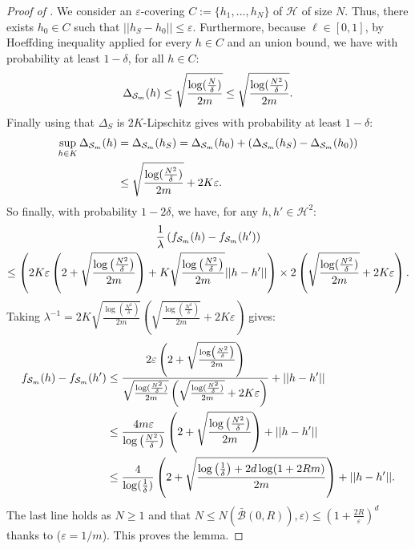\begin{noaddcontents}
\begin{proof}[Proof of ]
We consider an $\varepsilon$-covering $C:=\{h_1,...,h_N\}$ of $\mathcal{H}$ of size $N$.
Thus, there exists $h_0\in C$ such that $||h_S- h_0||\leq \varepsilon$.
Furthermore, because $\ell \in [0,1]$, by Hoeffding inequality applied for every $h\in C$ and an union bound, we have with probability at least $1-\delta$, for all $h\in C$:
\[ \Delta_{\mathcal{S}_m}(h) \leq  \sqrt{\frac{\log(\frac{N}{\delta})}{2m}} \leq   \sqrt{\frac{\log(\frac{N^2}{\delta})}{2m}}. \]
Finally using that $\Delta_S$ is $2K$-Lipschitz gives with probability at least $1-\delta$:
\begin{align*}
\sup_{h\in K} \Delta_{\mathcal{S}_m}(h) &= \Delta_{\mathcal{S}_m}(h_S) = \Delta_{\mathcal{S}_m}(h_0) + \left(\Delta_{\mathcal{S}_m}(h_S)- \Delta_{\mathcal{S}_m}(h_0)  \right) \\
& \leq  \sqrt{\frac{\log(\frac{N^2}{\delta})}{2m}} + 2K\varepsilon.
\end{align*}
So finally, with probability $1- 2\delta$, we have, for any $h,h'\in \mathcal{H}^2$:
\begin{multline*}
\frac{1}{\lambda} \left(f_{\mathcal{S}_m}(h)-f_{\mathcal{S}_m}(h') \right) \\ \leq \left(2K\varepsilon\left( 2 + \sqrt{\frac{\log\left(\frac{N^2}{\delta}\right)}{2m}}  \right) +  K\sqrt{\frac{\log\left(\frac{N^2}{\delta}\right)}{2m}}||h-h'|| \right)\times
2\left( \sqrt{\frac{\log(\frac{N^2}{\delta})}{2m}} + 2K\varepsilon \right).
\end{multline*}
Taking $\lambda^{-1}=  2K\sqrt{\frac{\log(\frac{N^2}{\delta})}{2m}}\left(\sqrt{\frac{\log(\frac{N^2}{\delta})}{2m}} + 2K\varepsilon \right)$ gives:
\begin{align*}
f_{\mathcal{S}_m}(h)-f_{\mathcal{S}_m}(h')  & \leq \frac{2\varepsilon\left( 2 + \sqrt{\frac{\log\left(\frac{N^2}{\delta}\right)}{2m}}  \right)}{\sqrt{\frac{\log(\frac{N^2}{\delta})}{2m}}\left(\sqrt{\frac{\log(\frac{N^2}{\delta})}{2m}} + 2K\varepsilon \right)} + ||h-h'||\\
& \leq \frac{4m\varepsilon}{\log\left(\frac{N^2}{\delta}\right)} \left( 2 + \sqrt{\frac{\log\left(\frac{N^2}{\delta}\right)}{2m}}  \right) + ||h-h'|| \\
& \leq \frac{4}{\log(\frac{1}{\delta})} \left( 2 + \sqrt{\frac{\log\left(\frac{1}{\delta}\right) + 2d\log(1+2Rm)}{2m}}  \right) + ||h-h'||.
\end{align*}
The last line holds as $N\geq1$ and that $N\leq N(\bar{\mathcal{B}}(0,R)), \varepsilon) \leq \left(1+\frac{2R}{\varepsilon}\right)^d$ thanks to  ($\varepsilon = 1/m$).
This proves the lemma.
\end{proof}


\end{noaddcontents}
